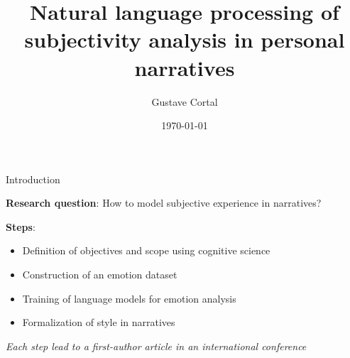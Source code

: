 \documentclass[handout,10pt]{beamer}
\title{Natural language processing of subjectivity analysis in personal narratives}
\author{Gustave Cortal}
\date{\today}
\begin{document}
\setlength{\parskip}{5pt}%
\setlength{\parsep}{0pt}%
\setlength{\itemsep}{0.25cm}%
\setlength{\leftmargini}{0.5cm}

\begin{frame}
  \titlepage
\end{frame}


\begin{frame}{Introduction}




\pause

\textbf{Research question}: How to model subjective experience in narratives?


\vspace{0.5cm}
\pause

\textbf{Steps}:

\begin{itemize}[<+->]
    \item Definition of objectives and scope using cognitive science
    \item Construction of an emotion dataset 
    \item Training of language models for emotion analysis 
    \item Formalization of style in narratives 
\end{itemize}

\vspace{0.5cm}
\pause

\small

\textit{Each step lead to a first-author article in an international conference} %

    
\end{frame}
\end{document}

